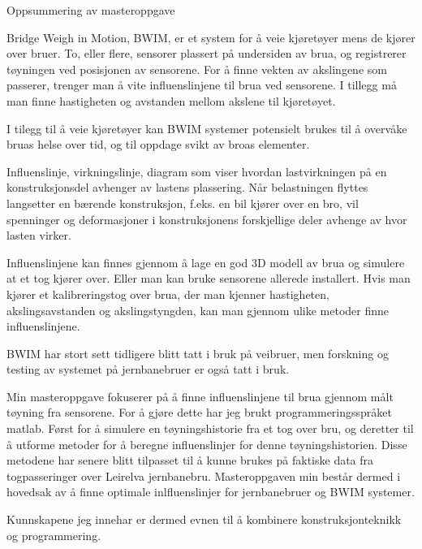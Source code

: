 Oppsummering av masteroppgave

Bridge Weigh in Motion, BWIM, er et system for å veie kjøretøyer mens de kjører over bruer. To, eller flere, sensorer plassert på undersiden av brua, og registrerer tøyningen ved posisjonen av sensorene. For å finne vekten av akslingene som passerer, trenger man å vite influenslinjene til brua ved sensorene. I tillegg må man finne hastigheten og avstanden mellom akslene til kjøretøyet.

I tilegg til å veie kjøretøyer kan BWIM systemer potensielt brukes til å overvåke bruas helse over tid, og til oppdage svikt av broas elementer.

Influenslinje, virkningslinje, diagram som viser hvordan lastvirkningen på en konstruksjonsdel avhenger av lastens plassering. Når belastningen flyttes langsetter en bærende konstruksjon, f.eks. en bil kjører over en bro, vil spenninger og deformasjoner i konstruksjonens forskjellige deler avhenge av hvor lasten virker. 

Influenslinjene kan finnes gjennom å lage en god 3D modell av brua og simulere at et tog kjører  over. Eller man kan bruke sensorene allerede installert. Hvis man kjører et kalibreringstog over brua, der man kjenner hastigheten, akslingsavstanden og akslingstyngden, kan man gjennom ulike metoder finne influenslinjene. 

BWIM har stort sett tidligere blitt tatt i bruk på veibruer, men forskning og testing av systemet på jernbanebruer er også tatt i bruk.

Min masteroppgave fokuserer på å finne influenslinjene til brua gjennom målt tøyning fra sensorene. For å gjøre dette har jeg brukt programmeringsspråket matlab. Først for å simulere en tøyningshistorie fra et tog over bru, og deretter til å utforme metoder for å beregne influenslinjer for denne tøyningshistorien. Disse metodene har senere blitt tilpasset til å kunne brukes på faktiske data fra togpasseringer over Leirelva jernbanebru. Masteroppgaven min består dermed i hovedsak av å finne optimale inlfluenslinjer for jernbanebruer og BWIM systemer.

Kunnskapene jeg innehar er dermed evnen til å kombinere konstruksjonteknikk og programmering.  